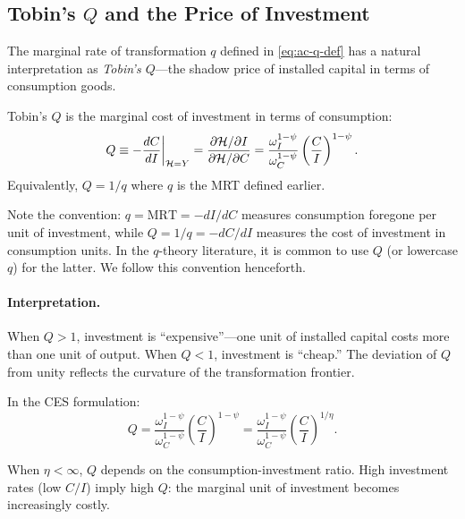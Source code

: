 \subsection{Tobin's $Q$ and the Price of Investment}
\label{subsec:ac-tobin-q}

The marginal rate of transformation $q$ defined in \cref{eq:ac-q-def} has a natural interpretation as \emph{Tobin's $Q$}---the shadow price of installed capital in terms of consumption goods.

\begin{definition}[Tobin's $Q$]
\label{def:tobin-q}
Tobin's $Q$ is the marginal cost of investment in terms of consumption:
\begin{equation}
Q \equiv -\frac{dC}{dI} \bigg|_{\mathcal{H} = Y} = \frac{\partial \mathcal{H} / \partial I}{\partial \mathcal{H} / \partial C} = \frac{\omega_I^{1-\psi}}{\omega_C^{1-\psi}} \left( \frac{C}{I} \right)^{1-\psi}.
\label{eq:ac-tobin-q}
\end{equation}
Equivalently, $Q = 1/q$ where $q$ is the MRT defined earlier.
\end{definition}

Note the convention: $q = \text{MRT} = -dI/dC$ measures consumption foregone per unit of investment, while $Q = 1/q = -dC/dI$ measures the cost of investment in consumption units. In the $q$-theory literature, it is common to use $Q$ (or lowercase $q$) for the latter. We follow this convention henceforth.

\paragraph{Interpretation.}
When $Q > 1$, investment is ``expensive''---one unit of installed capital costs more than one unit of output. When $Q < 1$, investment is ``cheap.'' The deviation of $Q$ from unity reflects the curvature of the transformation frontier.

In the CES formulation:
\begin{equation}
Q = \frac{\omega_I^{1-\psi}}{\omega_C^{1-\psi}} \left( \frac{C}{I} \right)^{1-\psi} = \frac{\omega_I^{1-\psi}}{\omega_C^{1-\psi}} \left( \frac{C}{I} \right)^{1/\eta}.
\label{eq:ac-Q-ces}
\end{equation}

When $\eta < \infty$, $Q$ depends on the consumption-investment ratio. High investment rates (low $C/I$) imply high $Q$: the marginal unit of investment becomes increasingly costly.

